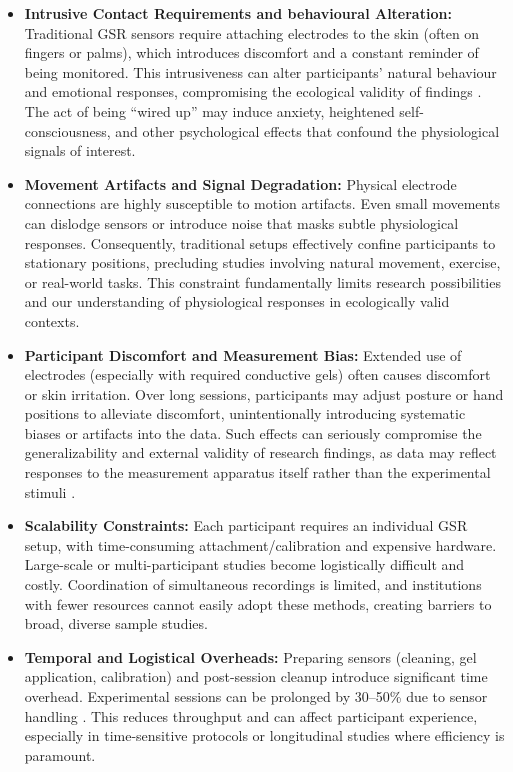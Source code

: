 \documentclass[11pt,a4paper]{report}
\begin{document}
\begin{itemize}
\item \textbf{Intrusive Contact Requirements and behavioural Alteration:} Traditional GSR sensors require attaching electrodes to the skin (often on fingers or palms), which introduces discomfort and a constant reminder of being monitored. This intrusiveness can alter participants' natural behaviour and emotional responses, compromising the ecological validity of findings \cite{cho2020gsr}. The act of being ``wired up'' may induce anxiety, heightened self-consciousness, and other psychological effects that confound the physiological signals of interest.
\item \textbf{Movement Artifacts and Signal Degradation:} Physical electrode connections are highly susceptible to motion artifacts. Even small movements can dislodge sensors or introduce noise that masks subtle physiological responses. Consequently, traditional setups effectively confine participants to stationary positions, precluding studies involving natural movement, exercise, or real-world tasks. This constraint fundamentally limits research possibilities and our understanding of physiological responses in ecologically valid contexts.
\item \textbf{Participant Discomfort and Measurement Bias:} Extended use of electrodes (especially with required conductive gels) often causes discomfort or skin irritation. Over long sessions, participants may adjust posture or hand positions to alleviate discomfort, unintentionally introducing systematic biases or artifacts into the data. Such effects can seriously compromise the generalizability and external validity of research findings, as data may reflect responses to the measurement apparatus itself rather than the experimental stimuli \cite{bucika2024repo}.
\item \textbf{Scalability Constraints:} Each participant requires an individual GSR setup, with time-consuming attachment/calibration and expensive hardware. Large-scale or multi-participant studies become logistically difficult and costly. Coordination of simultaneous recordings is limited, and institutions with fewer resources cannot easily adopt these methods, creating barriers to broad, diverse sample studies.
\item \textbf{Temporal and Logistical Overheads:} Preparing sensors (cleaning, gel application, calibration) and post-session cleanup introduce significant time overhead. Experimental sessions can be prolonged by 30--50\% due to sensor handling \cite{Kim2008Emotion}. This reduces throughput and can affect participant experience, especially in time-sensitive protocols or longitudinal studies where efficiency is paramount.
\end{itemize}
\end{document}
